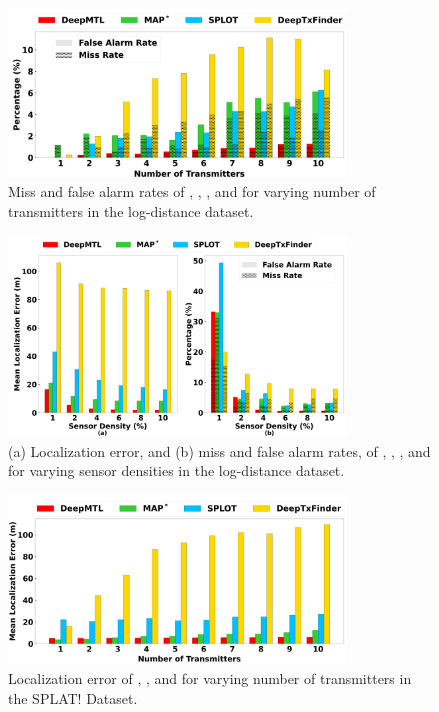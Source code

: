 \begin{figure}[t]
	\centering
	\includegraphics[width=0.8\textwidth]{chapters/wowmom-pmc/figures/log_distance-missfalse_vary_numintru.png}
	\caption{Miss and false alarm rates of \our, \map, \splot, and \deeptx for varying number of transmitters in the log-distance dataset.}
	\label{fig:logdist-missfalse-vary-numintru}
\end{figure}


\begin{figure}[t]
	\centering
	\includegraphics[width=0.8\textwidth]{chapters/wowmom-pmc/figures/log_distance-error_missfalse_vary_sendensity.png}
	\caption{(a) Localization error, and (b) miss and false alarm rates, of \our, \map, \splot, and \deeptx for varying sensor densities in the log-distance dataset.}
	\label{fig:logdist-error_missfalse-vary-sendensity}
\end{figure}






\begin{figure}[ht]
	\centering
	\includegraphics[width=0.8\textwidth]{chapters/wowmom-pmc/figures/splat-error_vary_numintru.png}
	\caption{Localization error of \our, \map, \deeptx and \splot for varying number of transmitters in the SPLAT! Dataset. }
	\label{fig:splat-error-vary_numintru}
\end{figure}

